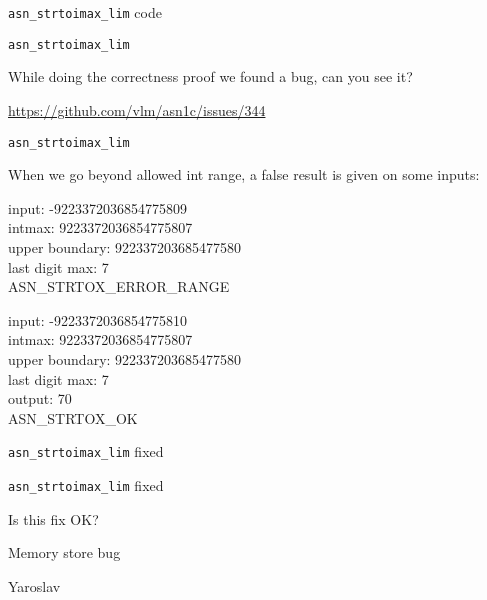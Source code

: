 \documentclass[10pt]{beamer}
\begin{document}
\begin{frame}{\texttt{asn\_strtoimax\_lim} code}
  
  {\fontsize{3}{1}\selectfont  }
  
\end{frame}


\begin{frame}{\texttt{asn\_strtoimax\_lim}}


While doing the correctness proof we found a bug, can you see it?

  \url{https://github.com/vlm/asn1c/issues/344}
  
\end{frame}

\begin{frame}{\texttt{asn\_strtoimax\_lim}}

When we go beyond allowed int range, a false result is given on some inputs:  

input: -9223372036854775809 \\
intmax: 9223372036854775807 \\
upper boundary: 922337203685477580 \\
last digit max: 7\\
ASN\_STRTOX\_ERROR\_RANGE\\

\bigskip

input: -9223372036854775810 \\
intmax: 9223372036854775807 \\
upper boundary: 922337203685477580 \\ 
last digit max: 7 \\
output: 70 \\
ASN\_STRTOX\_OK


\end{frame}

\begin{frame}{\texttt{asn\_strtoimax\_lim} fixed}
  
    {\fontsize{4}{1}\selectfont }

\end{frame}
  
  \begin{frame}[fragile]{\texttt{asn\_strtoimax\_lim} fixed}

  Is this fix OK?
  
\end{frame}

\begin{frame}{Memory store bug}

    Yaroslav
  
\end{frame}
\end{document}
